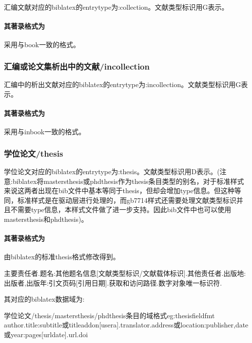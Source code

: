 \begin{refentry}{}{}
汇编文献对应的biblatex的entrytype为:collection。文献类型标识用G表示。

\paragraph{其著录格式为} 采用与book一致的格式。
\end{refentry}

\subsubsection{汇编或论文集析出中的文献/incollection}
\begin{refentry}{}{}
汇编中的析出文献对应的biblatex的entrytype为:incollection。文献类型标识用G表示。

\paragraph{其著录格式为} 采用与inbook一致的格式。
\end{refentry}

\subsubsection{学位论文/thesis}
\begin{refentry}{}{}
学位论文对应的biblatex的entrytype为:thesis。文献类型标识用D表示。(注意:biblatex将mastersthesis或phdthesis作为thesis条目类型的别名，对于标准样式来说这两者出现在bib文件中基本等同于thesis，但却会增加type信息。但这种等同，标准样式是在驱动层进行处理的，而gb7714样式还需要处理文献类型标识并且不需要type信息，本样式文件做了进一步支持。因此bib文件中也可以使用mastersthesis和phdthesis)。

\paragraph{其著录格式为} 由biblatex的标准thesis格式修改得到。

主要责任者.题名:其他题名信息[文献类型标识/文献载体标识].其他责任者.出版地:出版者,出版年:引文页码[引用日期].获取和访问路径.数字对象唯一标识符.
\end{refentry}

其对应的biblatex数据域为:
\begin{codetex}{学位论文/thesis/mastersthesis/phdthesis条目的域格式}{eg:thesisfieldfmt}
author.title:subtitle或titleaddon[usera].translator.address或location:publisher,date或year:pages[urldate].url.doi
\end{codetex}

